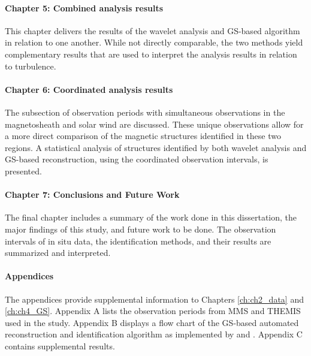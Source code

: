 \paragraph*{Chapter 5: Combined analysis results}
This chapter delivers the results of the wavelet analysis and GS-based algorithm in relation to one another. While not directly comparable, the two methods yield complementary results that are used to interpret the analysis results in relation to turbulence.

\paragraph*{Chapter 6: Coordinated analysis results}
The subsection of observation periods with simultaneous observations in the magnetosheath and solar wind are discussed. These unique observations allow for a more direct comparison of the magnetic structures identified in these two regions. A statistical analysis of structures identified by both wavelet analysis and GS-based reconstruction, using the coordinated observation intervals, is presented.

\paragraph*{Chapter 7: Conclusions and Future Work}
The final chapter includes a summary of the work done in this dissertation, the major findings of this study, and future work to be done. The observation intervals of in situ data, the identification methods, and their results are summarized and interpreted.

\paragraph*{Appendices}
The appendices provide supplemental information to Chapters \ref{ch:ch2_data} and \ref{ch:ch4_GS}. Appendix A lists the observation periods from MMS and THEMIS used in the study. Appendix B displays a flow chart of the GS-based automated reconstruction and identification algorithm as implemented by \cite{Hu:2018} and \cite{Zheng:2018}. Appendix C contains supplemental results.